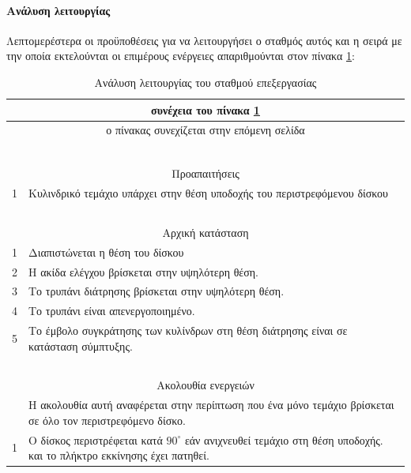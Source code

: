 \documentclass[a4paper,12pt,twoside]{report}
\begin{document}
				\paragraph{Ανάλυση λειτουργίας} {Λεπτομερέστερα οι προϋποθέσεις για να λειτουργήσει ο σταθμός αυτός και η σειρά με την οποία εκτελούνται οι επιμέρους ενέργειες απαριθμούνται στον πίνακα \ref{πιν.:Ανάλυση λειτουργίας του σταθμού επεξεργασίας}:
				}
				\begin{longtable} { m{0.5cm} m{12cm} }
					\caption [Ανάλυση λειτουργίας του σταθμού επεξεργασίας]  {Ανάλυση λειτουργίας του σταθμού επεξεργασίας \cite{FestoMPSProcessingStationManual}}
					\label{πιν.:Ανάλυση λειτουργίας του σταθμού επεξεργασίας}\\
					\hline
					\endfirsthead
					\multicolumn{2}{c}{συνέχεια του πίνακα \ref{πιν.:Ανάλυση λειτουργίας του σταθμού επεξεργασίας}}\\
					\hline
					\endhead
					\hline
					\multicolumn{2}{c}{ο πίνακας συνεχίζεται στην επόμενη σελίδα}\\
					\endfoot
					\multicolumn{2}{c}{ολοκληρώθηκε ο πίνακας \ref{πιν.:Ανάλυση λειτουργίας του σταθμού επεξεργασίας}}\\
					\endlastfoot
					~\\
					\multicolumn{2}{c}{Προαπαιτήσεις}\\
					1 & Κυλινδρικό τεμάχιο υπάρχει στην θέση υποδοχής του περιστρεφόμενου δίσκου\\
					\hline
					~\\
					\multicolumn{2}{c}{Αρχική κατάσταση}\\
					1 & Διαπιστώνεται η θέση του δίσκου\\
					2 & Η ακίδα ελέγχου βρίσκεται στην υψηλότερη θέση.\\
					3 & Το τρυπάνι διάτρησης βρίσκεται στην υψηλότερη θέση.\\
					4 & Το τρυπάνι είναι απενεργοποιημένο.\\
					5 & Το έμβολο συγκράτησης των κυλίνδρων στη θέση διάτρησης είναι σε κατάσταση σύμπτυξης.\\
					\hline
					~\\
					\multicolumn{2}{c}{Ακολουθία ενεργειών}\\
					  & Η ακολουθία αυτή αναφέρεται στην περίπτωση που ένα μόνο τεμάχιο βρίσκεται σε όλο τον περιστρεφόμενο δίσκο.\\
					1 & Ο δίσκος περιστρέφεται κατά $90^{\circ}$ εάν ανιχνευθεί τεμάχιο στη θέση υποδοχής. και το πλήκτρο εκκίνησης έχει πατηθεί.\\

\end{longtable}
\end{document}
